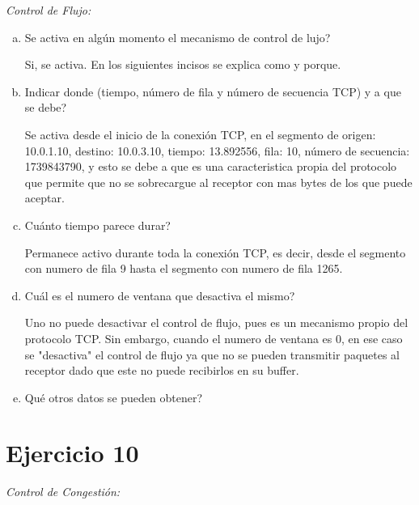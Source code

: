 \documentclass[osajnl,twocolumn,showpacs,superscriptaddress,10pt]{revtex4-1} %
\begin{document}
\textit{Control de Flujo:}

\begin{enumerate}[a)]
    \item Se activa en algún momento el mecanismo de control de lujo?

    Si, se activa. En los siguientes incisos se explica como y porque.
   
    \item Indicar donde (tiempo, número de fila y número de secuencia TCP) y a que se debe?

    Se activa desde el inicio de la conexión TCP, en el segmento de origen: 10.0.1.10, destino: 10.0.3.10, tiempo: 13.892556, fila: 10, número de secuencia: 1739843790, y esto
    se debe a que es una caracteristica propia del protocolo que permite que no se sobrecargue al receptor con mas bytes de los que puede aceptar.    

    \item Cuánto tiempo parece durar?

    Permanece activo durante toda la conexión TCP, es decir, desde el segmento con numero de fila 9 hasta el segmento
    con numero de fila 1265.

    \item Cuál es el numero de ventana que desactiva el mismo?

    Uno no puede desactivar el control de flujo, pues es un mecanismo propio del protocolo TCP. Sin embargo, cuando el numero de ventana es 0, en ese caso se "desactiva" 
    el control de flujo ya que no se pueden transmitir paquetes al receptor dado que este no puede recibirlos en su buffer.

    \item Qué otros datos se pueden obtener?
\end{enumerate}

\section{Ejercicio 10}

\textit{Control de Congestión:}
\end{document}
